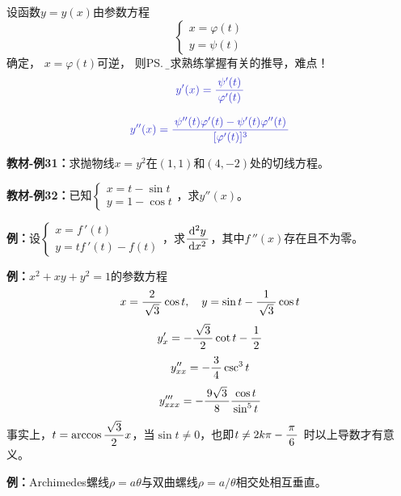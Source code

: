 设函数$y=y(x)$由参数方程
$$\left\{
\begin{array}{l}
x=\varphi(t)\\
y=\psi(t)
\end{array}
\right.$$
确定， $x=\varphi(t)$可逆， 则\ps{\b 要求熟练掌握有关的推导，难点！}
$${\b y'(x)=\df{\psi'(t)}{\varphi'(t)}}$$

$${\b y''(x)=\df{\psi''(t)\varphi'(t)-\psi'(t)\varphi''(t)}{[\varphi'(t)]^3}}$$

{\bf 教材-例31：}求抛物线$x=y^2$在$(1,1)$和$(4,-2)$处的切线方程。

{\bf 教材-例32：}已知$\left\{\begin{array}{l}x=t-\sin t\\
y=1-\cos t\end{array}\right.$，求$y''(x)$。

\begin{center}
\end{center}

{\bf 例：}设$\left\{\begin{array}{l}x=f\,'(t)\\ y=tf\,'(t)-f(t)
\end{array}\right.$，求$\displaystyle\frac{\,{\mathrm{d}^2y}\,}{\,{\mathrm{d} x^2}\,}$，其中$f\,''(x)$存在且不为零。

{\bf 例：}$x^2+xy+y^2=1$的参数方程
$$x=\displaystyle\frac{\,{2}\,}{\,{\sqrt3}\,}\cos t,\quad y=\sin t-\displaystyle\frac{\,{1}\,}{\,{\sqrt3}\,}\cos t$$
$$y'_x=-\displaystyle\frac{\,{\sqrt3}\,}{\,{2}\,}\cot t-\displaystyle\frac{\,{1}\,}{\,{2}\,}$$
$$y''_{xx}=-\displaystyle\frac{\,{3}\,}{\,{4}\,}\csc^3t$$
$$y'''_{xxx}=-\displaystyle\frac{\,{9\sqrt3}\,}{\,{8}\,}\displaystyle\frac{\,{\cos t}\,}{\,{\sin^5t}\,}$$
事实上，$t=\arccos\displaystyle\frac{\,{\sqrt3}\,}{\,{2}\,}x$，当$\sin t\ne0$，也即$t\ne2k\pi-\displaystyle\frac{\,{\pi}\,}{\,{6}\,}$
时以上导数才有意义。

{\bf 例：}Archimedes螺线$\rho=a\theta$与双曲螺线$\rho=a/\theta$相交处相互垂直。

